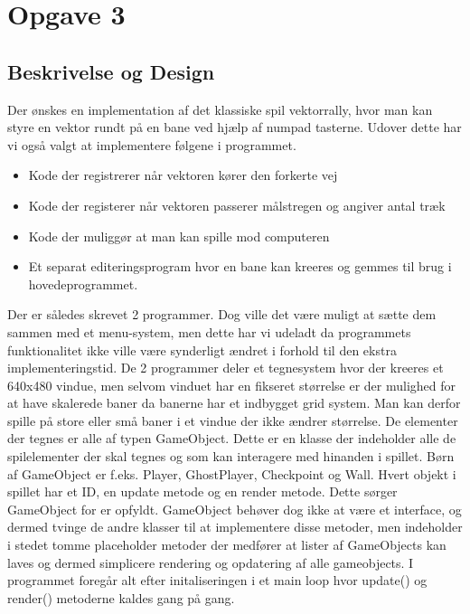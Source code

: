 \section{Opgave 3}
\subsection{Beskrivelse og Design}
Der ønskes en implementation af det klassiske spil vektorrally, hvor man kan styre en vektor rundt på en bane ved hjælp af numpad tasterne. Udover dette har vi også valgt at implementere følgene i programmet.
\begin{itemize}
\item Kode der registrerer når vektoren kører den forkerte vej
\item Kode der registerer når vektoren passerer målstregen og angiver antal træk
\item Kode der muliggør at man kan spille mod computeren
\item Et separat editeringsprogram hvor en bane kan kreeres og gemmes til brug i hovedeprogrammet.
\end{itemize}
Der er således skrevet 2 programmer. Dog ville det være muligt at sætte dem sammen med et menu-system, men dette har vi udeladt da programmets funktionalitet ikke ville være synderligt ændret i forhold til den ekstra implementeringstid. 
De 2 programmer deler et tegnesystem hvor der kreeres et 640x480 vindue, men selvom vinduet har en fikseret størrelse er der mulighed for at have skalerede baner da banerne har et indbygget grid system. Man kan derfor spille på store eller små baner i et vindue der ikke ændrer størrelse.
De elementer der tegnes er alle af typen GameObject. Dette er en klasse der indeholder alle de spilelementer der skal tegnes og som kan interagere med hinanden i spillet. Børn af GameObject er f.eks. Player, GhostPlayer, Checkpoint og Wall. Hvert objekt i spillet har et ID, en update metode og en render metode. Dette sørger GameObject for er opfyldt. GameObject behøver dog ikke at være et interface, og dermed tvinge de andre klasser til at implementere disse metoder, men indeholder i stedet tomme placeholder metoder der medfører at lister af GameObjects kan laves og dermed simplicere rendering og opdatering af alle gameobjects.
I programmet foregår alt efter initaliseringen  i et main loop hvor update() og render() metoderne kaldes gang på gang.
